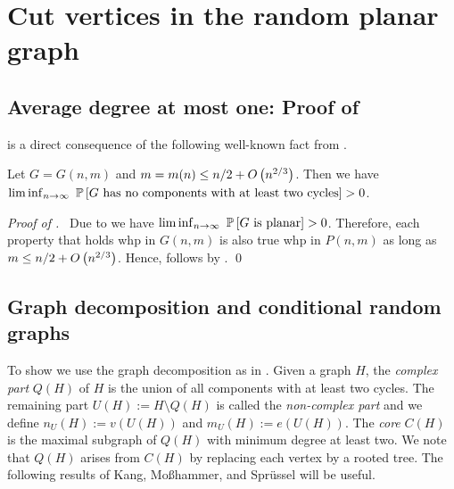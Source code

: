 \section{Cut vertices in the random planar graph}\label{sec:planar}
\subsection[Average degree at most one]{Average degree at most one: Proof of }
 is a direct consequence of the following well-known fact from \cite{Britikov1989}.
\begin{thm}\label{thm:non_complex}
Let $G=G(n,m)$ and $m=m(n)\leq n/2+O\left(n^{2/3}\right)$. Then we have $\liminf_{n \to \infty}~ \mathbb{P}\left[G \text{ has no components with at least two cycles}\right]>0$.	
\end{thm}
{\itshape Proof of .}~
Due to  we have  $\liminf_{n \to \infty}~ \mathbb{P}\left[G \text{ is planar}\right]>0$. Therefore, each property that holds whp in $G(n,m)$ is also true whp in $P(n,m)$ as long as $m\leq n/2+O\left(n^{2/3}\right)$. Hence,  follows by . \qed
	
\subsection{Graph decomposition and conditional random graphs}\label{sub:decomp}
To show  we use the graph decomposition as in \cite{KangMosshammerSpruessel2020}. Given a graph $H$, the {\em complex part} $Q(H)$ of $H$ is the union of all components with at least two cycles. The remaining part $U(H):=H\setminus Q(H)$ is called the {\em non-complex part} and we define $n_U(H):=v(U(H))$ and $m_U(H):=e(U(H))$. The {\em core} $C(H)$ is the maximal subgraph of $Q(H)$ with minimum degree at least two. We note that $Q(H)$ arises from $C(H)$ by replacing each vertex by a rooted tree. The following results of Kang, Mo{\ss}hammer, and Spr\"{u}ssel \cite{KangMosshammerSpruessel2020} will be useful. 
	
